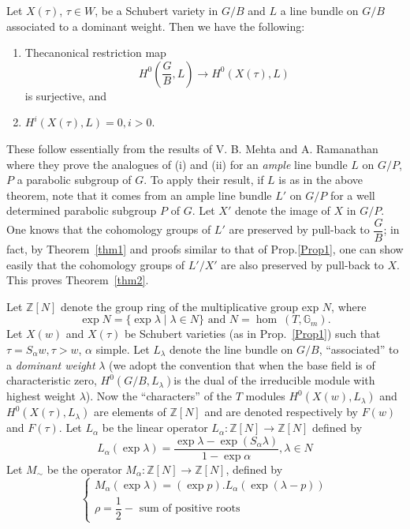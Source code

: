 \begin{thm}\label{thm2}
Let $X(\tau)$, $\tau \in W$, be a Schubert variety in $G/B$ and $L$ a line bundle on $G/B$ associated to a dominant weight. Then we have the following: 
\begin{enumerate}
\renewcommand{\theenumi}{\roman{enumi}}
\renewcommand{\labelenumi}{(\theenumi)}
\item The\pageoriginale canonical restriction map 
$$
H^{0}\left(\dfrac{G}{B}, L\right)\to H^{0}(X(\tau), L)
$$
is surjective, and 
\item $H^{i}(X(\tau), L)=0, i>0$. 
\end{enumerate}
\end{thm}

\begin{Proof}
These follow essentially from the results of V. B. Mehta and A. Ramanathan \cite{key4} where they prove the analogues of (i) and (ii) for an \textit{ample} line bundle $L$ on $G/P$, $P$ a parabolic subgroup of $G$. To apply their result, if $L$ is as in the above theorem, note that it comes from an ample line bundle $L'$ on $G/P$ for a well determined parabolic subgroup $P$ of $G$. Let $X'$ denote the image of $X$ in $G/P$. One knows that the cohomology groups of $L'$ are preserved by pull-back to $\dfrac{G}{B}$; in fact, by Theorem~\ref{thm1} and proofs similar to that of Prop.\ref{Prop1}, one can show easily that the cohomology groups of $L'/X'$ are also preserved by pull-back to $X$. This proves Theorem~\ref{thm2}. 

Let $\mathbb{Z}[N]$ denote the group ring of the multiplicative group exp $N$, where 
$$
\exp N=\{\exp \lambda\mid \lambda \in N\} \text{ and } N=\hom\ (T, \mathbb{G}_m).
$$
Let $X(w)$ and $X(\tau)$ be Schubert varieties (as in Prop.~\ref{Prop1}) such that $\tau=S_{\alpha}w, \tau > w$, $\alpha$ simple. Let $L_{\lambda}$ denote the line bundle on $G/B$, ``associated'' to a \textit{dominant weight} $\lambda$ (we adopt the convention that when the base field is of characteristic zero, $H^{0}(G/B, L_{\lambda})$\pageoriginale is the dual of the irreducible module with highest weight $\lambda$). Now the ``characters'' of the $T$ modules $H^{0}(X(w), L_{\lambda})$ and $H^{0}(X(\tau), L_{\lambda})$ are elements of $\mathbb{Z}[N]$ and are denoted respectively by $F(w)$ and $F(\tau)$. Let $L_{\alpha}$ be the linear operator $L_{\alpha}:\mathbb{Z}[N]\to \mathbb{Z}[N]$ defined by 
$$
L_{\alpha}(\exp \lambda)=\dfrac{\exp \lambda - \exp (S_{\alpha} \lambda)}{1-\exp \alpha}, \lambda \in N 
$$
Let $M_{\sim}$  be the operator $M_{\alpha}:\mathbb{Z}[N]\to \mathbb{Z}[N]$, defined by 
$$
\begin{cases}
M_{\alpha}(\exp \lambda)=(\exp p). L_{\alpha}(\exp (\lambda-p))\\
\rho=\dfrac{1}{2}- \text{ sum of positive roots }
\end{cases}
$$
\end{Proof}

